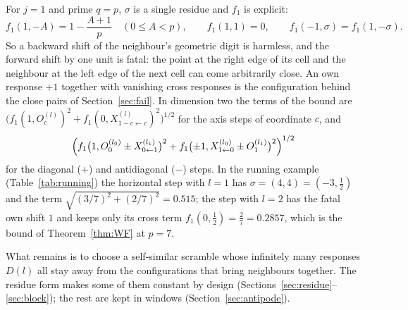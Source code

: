 \begin{remark}\label{rem:onedigit}
For $j=1$ and prime $q=p$, $\sigma$ is a single residue and $f_1$ is explicit:
\[
f_1(1,-A)=1-\frac{A+1}{p}\quad(0\le A<p),\qquad f_1(1,1)=0,\qquad f_1(-1,\sigma)=f_1(1,-\sigma).
\]
So a backward shift of the neighbour's geometric digit is harmless, and the forward shift by one unit is fatal: the point at the right edge of its cell and the neighbour at the left edge of the next cell can come arbitrarily close. An own response $+1$ together with vanishing cross responses is the configuration behind the close pairs of Section~\ref{sec:fail}. In dimension two the terms of the bound are $\bigl(f_1(1,O_c^{(l)})^2+f_1(0,X_{1-c\leftarrow c}^{(l)})^2\bigr)^{1/2}$ for the axis steps of coordinate $c$, and
\[
\Bigl(f_1\bigl(1,O_0^{(l_0)}\pm X_{0\leftarrow1}^{(l_1)}\bigr)^2+f_1\bigl(\pm1,X_{1\leftarrow0}^{(l_0)}\pm O_1^{(l_1)}\bigr)^2\Bigr)^{1/2}
\]
for the diagonal ($+$) and antidiagonal ($-$) steps. In the running example (Table~\ref{tab:running}) the horizontal step with $l=1$ has $\sigma=(4,4)=(-3,\frac12)$ and the term $\sqrt{(3/7)^2+(2/7)^2}=0.515$; the step with $l=2$ has the fatal own shift $1$ and keeps only its cross term $f_1(0,\frac12)=\frac27=0.2857$, which is the bound of Theorem~\ref{thm:WF} at $p=7$.
\end{remark}

What remains is to choose a self-similar scramble whose infinitely many responses $D(l)$ all stay away from the configurations that bring neighbours together. The residue form makes some of them constant by design (Sections~\ref{sec:residue}--\ref{sec:block}); the rest are kept in windows (Section~\ref{sec:antipode}).
